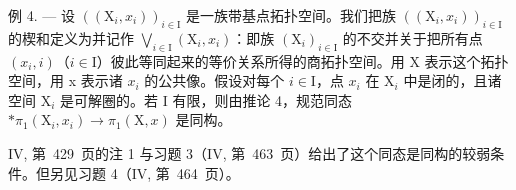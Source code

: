 例 4. — 设 \(((\mathrm{X}_{i}, x_{i}))_{i \in \mathrm{I}}\) 是一族带基点拓扑空间。我们把族 \(((\mathrm{X}_{i}, x_{i}))_{i \in \mathrm{I}}\) 的楔和定义为并记作 \(\bigvee_{i \in \mathrm{I}} (\mathrm{X}_{i}, x_{i})\)：即族 \((\mathrm{X}_{i})_{i \in \mathrm{I}}\) 的不交并关于把所有点 \((x_{i}, i)\)（\(i \in \mathrm{I}\)）彼此等同起来的等价关系所得的商拓扑空间。用 X 表示这个拓扑空间，用 x 表示诸 \(x_{i}\) 的公共像。假设对每个 \(i \in \mathrm{I}\)，点 \(x_{i}\) 在 \(\mathrm{X}_{i}\) 中是闭的，且诸空间 \(\mathrm{X}_{i}\) 是可解圈的。若 I 有限，则由推论 4，规范同态 \(* \pi_{1}(\mathrm{X}_{i}, x_{i}) \to \pi_{1}(\mathrm{X}, x)\) 是同构。

IV, 第~429~页的注 1 与习题 3（IV, 第~463~页）给出了这个同态是同构的较弱条件。但另见习题 4（IV, 第~464~页）。

